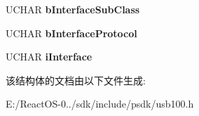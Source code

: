 \begin{DoxyCompactItemize}
\item 
\mbox{\label{struct___u_s_b___i_n_t_e_r_f_a_c_e___d_e_s_c_r_i_p_t_o_r_a1bdca580fa18a1944e6a16f2592bca19}} 
U\+C\+H\+AR {\bfseries b\+Interface\+Sub\+Class}
\item 
\mbox{\label{struct___u_s_b___i_n_t_e_r_f_a_c_e___d_e_s_c_r_i_p_t_o_r_a810c24872dbbcdb740dd9d4b300a42ac}} 
U\+C\+H\+AR {\bfseries b\+Interface\+Protocol}
\item 
\mbox{\label{struct___u_s_b___i_n_t_e_r_f_a_c_e___d_e_s_c_r_i_p_t_o_r_ae75857610500d2ce0d4ceb30efd0e09e}} 
U\+C\+H\+AR {\bfseries i\+Interface}
\end{DoxyCompactItemize}


该结构体的文档由以下文件生成\+:\begin{DoxyCompactItemize}
\item 
E\+:/\+React\+O\+S-\/0../sdk/include/psdk/usb100.\+h\end{DoxyCompactItemize}
